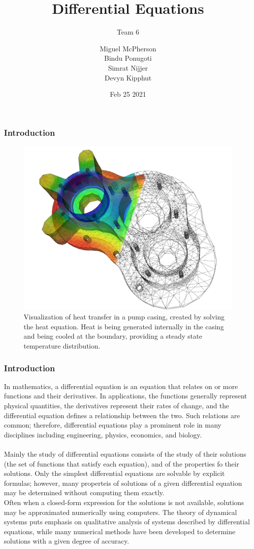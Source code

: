 \documentclass{beamer}
\title{Differential Equations}
\subtitle{Team 6}
\author{Miguel McPherson\\ Bindu Ponugoti\\ Simrat Nijjer\\ Devyn Kipphut }
\date{Feb 25 2021}
\begin{document}
\frame{\titlepage}

\begin{frame}[allowframebreaks]
  \frametitle {Introduction}
  \begin{figure}
    \begin{minipage}{.65\textwidth}
      \includegraphics[width=\linewidth]{differentialEquationsIntroimage1} 
      \caption{Visualization of heat transfer in a pump casing, created by solving the heat equation. Heat is being generated internally in the casing and being cooled at the boundary, providing a steady state temperature distribution.}
    \end{minipage}\hfill
  \end{figure}
\end{frame}

\begin{frame}[allowframebreaks]
\frametitle {Introduction}
    In mathematics, a differential equation is an equation that relates on or more functions and their derivatives.
    In applications, the functions generally represent physical quantities, the derivatives represent their rates of change,
    and the differential equation defines a relationship between the two. Such relations are common; therefore, differential equations play a prominent role in 
    many disciplines including engineering, physics, economics, and biology. 
    \\~\\
    Mainly the study of differential equations consists of the study of their solutions (the set of functions that satisfy each equation), and of the properties fo their solutions.
    Only the simplest differential equations are solvable by explicit formulas; however, many properteis of solutions of a given differential equation may be determined without
    computing them exactly. 
    \\\framebreak
    Often when a closed-form expression for the solutions is not available, solutions may be approximated numerically using computers. 
    The theory of dynamical systems puts emphasis on qualitative analysis of systems described by differential equations, 
    while many numerical methods have been developed to determine solutions with a given degree of accuracy.
\end{frame}
\end{document}
